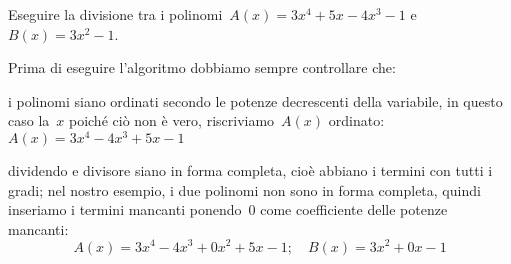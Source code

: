  \begin{esempio}
Eseguire la divisione tra i polinomi~\(A(x)=3x^4+5x-4x^3-1\) 
e~\(B(x)=3x^2-1\).

Prima di eseguire l'algoritmo dobbiamo sempre controllare che:
\begin{itemize*}
 \item i polinomi siano ordinati secondo le potenze decrescenti della 
 variabile, in questo caso la~\(x\) poiché ciò
    non è vero, riscriviamo~\(A(x)\) ordinato:~\(A(x)=3x^4-4x^3+5x-1\)
 \item dividendo e divisore siano in forma completa, cioè abbiano i termini 
 con tutti i gradi; nel nostro esempio, i due polinomi non sono in
    forma completa, quindi inseriamo i termini mancanti ponendo~0 come 
    coefficiente delle potenze mancanti:
    \[A(x)=3x^4-4x^3+0x^2+5x-1; \quad B(x)=3x^2+0x-1\]
\end{itemize*}


\begin{comment}

\affiancati{\primo}{\secondo}{
}{
}

\end{comment}
\def \primo{.39}
\def \secondo{.59}


\end{esempio}
